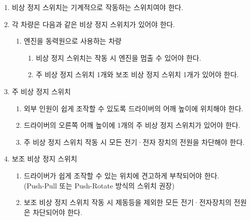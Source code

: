 \documentclass[final,a4paper,10pt]{report}
\begin{document}
\begin{enumerate}
  \item\label{rule:formula-technical.emergency-stop-switch.mechanically-actuated} 비상 정지 스위치는 기계적으로 작동하는 스위치여야 한다.

  \item\label{rule:formula-technical.emergency-stop-switch.required-switches} 각 차량은 다음과 같은 비상 정지 스위치가 있어야 한다.
    \begin{enumerate}
      \item\label{rule:formula-technical.emergency-stop-switch.required-switches.ice} 엔진을 동력원으로 사용하는 차량
        \begin{enumerate}
          \item\label{rule:formula-technical.emergency-stop-switch.required-switches.ice.stops-engine} 비상 정지 스위치는 작동 시 엔진을 멈출 수 있어야 한다.
          \item\label{rule:formula-technical.emergency-stop-switch.required-switches.ice.primary-and-secondary-count} 주 비상 정지 스위치 1개와 보조 비상 정지 스위치 1개가 있어야 한다.
        \end{enumerate}
    \end{enumerate}

  \item\label{rule:formula-technical.emergency-stop-switch.primary-switch} 주 비상 정지 스위치 \label{item:주 비상 정지 스위치}
    \begin{enumerate}
      \item\label{rule:formula-technical.emergency-stop-switch.primary-switch.external-accessibility} 외부 인원이 쉽게 조작할 수 있도록 드라이버의 어깨 높이에 위치해야 한다.
      \item\label{rule:formula-technical.emergency-stop-switch.primary-switch.right-shoulder-mounting} 드라이버의 오른쪽 어깨 높이에 1개의 주 비상 정지 스위치가 있어야 한다.
      \item\label{rule:formula-technical.emergency-stop-switch.primary-switch.cuts-all-electrical-power} 주 비상 정지 스위치 작동 시 모든 전기·전자 장치의 전원을 차단해야 한다.
    \end{enumerate}

  \item\label{rule:formula-technical.emergency-stop-switch.secondary-switch} 보조 비상 정지 스위치 \label{item:보조 비상 정지 스위치}
    \begin{enumerate}
      \item\label{rule:formula-technical.emergency-stop-switch.secondary-switch.driver-accessible-mounting} 드라이버가 쉽게 조작할 수 있는 위치에 견고하게 부착되어야 한다.\\
        (Push-Pull 또는 Push-Rotate 방식의 스위치 권장)
      \item\label{rule:formula-technical.emergency-stop-switch.secondary-switch.cutoff-except-brake-light} 보조 비상 정지 스위치 작동 시 제동등을 제외한 모든 전기·전자장치의 전원은 차단되어야 한다.
    \end{enumerate}


\end{enumerate}
\end{document}

